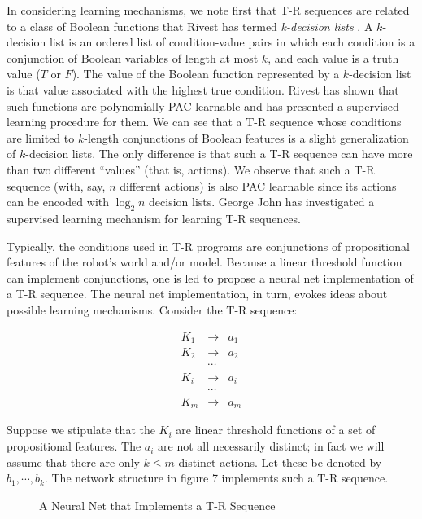 In considering learning mechanisms, we note first that T-R sequences are  
related to a class of Boolean functions that Rivest has termed {\it  
k-decision lists}  \cite{Rivest,Kohavi}.  A $k$-decision list is an ordered  
list of condition-value pairs in which each condition is a conjunction of  
Boolean variables of length at most $k$, and each value is a truth value ($T$  
or $F$).  The value of the Boolean function represented by a $k$-decision  
list is that value associated with the highest true condition.  Rivest has  
shown that such functions are polynomially PAC learnable and has presented a  
supervised learning procedure for them.  We can see that a T-R sequence whose  
conditions are limited to $k$-length conjunctions of Boolean features is a  
slight generalization of $k$-decision lists.  The only difference is that  
such a T-R sequence can have more than two different ``values'' (that is,  
actions).  We observe that such a T-R sequence (with, say, $n$ different  
actions) is also PAC learnable since its actions can be encoded with $\log_2  
n$ decision lists.  George John \cite{John} has investigated a supervised  
learning mechanism for learning T-R sequences.

Typically, the conditions used in T-R programs are conjunctions of  
propositional features of the robot's world and/or model. Because a linear  
threshold function can implement conjunctions, one is led to propose a neural  
net implementation of a T-R sequence.  The neural net implementation, in  
turn, evokes ideas about possible learning mechanisms.  Consider the T-R  
sequence:

\begin{eqnarray*}
K_1 & \rightarrow & a_1 \\
K_2 & \rightarrow & a_2 \\
 & \cdots &  \\
 K_i & \rightarrow & a_i  \\
 & \cdots &  \\
  K_m & \rightarrow & a_m  

\end{eqnarray*}

\noindent Suppose  we stipulate that the $K_i$ are linear threshold functions  
of a set of propositional features.
The $a_i$ are not all necessarily distinct; in fact we will assume that there  
are only $k \leq m$ distinct actions.  Let these be denoted by $b_1, \cdots,  
b_k$. The network structure in figure 7 implements such a T-R sequence.


\begin{figure}[htb]
\centerline{}
\caption{A Neural Net that Implements a T-R Sequence} 

\end{figure} 



